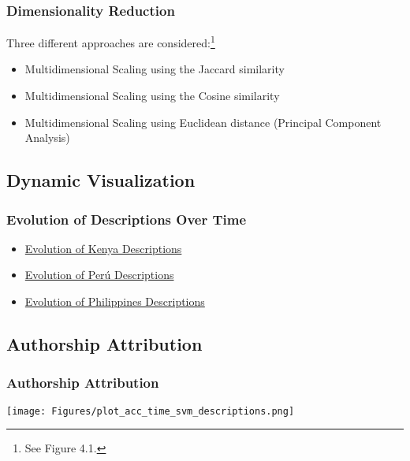 \documentclass{beamer}
\begin{document}
\begin{frame}\frametitle{Dimensionality Reduction}
Three different approaches are considered:\footnote{See Figure 4.1.}
\begin{itemize}
\item Multidimensional Scaling using the Jaccard similarity
\item Multidimensional Scaling using the Cosine similarity
\item Multidimensional Scaling using Euclidean distance (Principal Component
Analysis)
\end{itemize}
\end{frame}


\subsection{Dynamic Visualization}
\begin{frame}\frametitle{Evolution of Descriptions Over Time}
\begin{itemize}
\item \href{https://github.com/mvalenti12/TFM/blob/master/gifs/gif_kenya.gif}{Evolution of Kenya Descriptions}
\item \href{https://github.com/mvalenti12/TFM/blob/master/gifs/gif_peru.gif}{Evolution of Perú Descriptions}
\item \href{https://github.com/mvalenti12/TFM/blob/master/gifs/gif_philippines.gif}{Evolution of Philippines Descriptions}
\end{itemize}
\end{frame}

\subsection{Authorship Attribution}
\begin{frame}\frametitle{Authorship Attribution}
\begin{center}
\texttt{[image: Figures/plot\_acc\_time\_svm\_descriptions.png]}
\end{center}
\end{frame}
\end{document}
